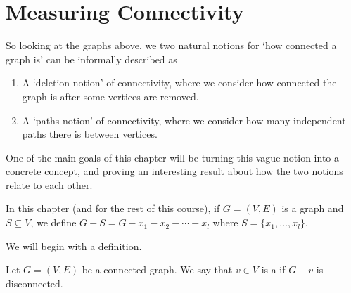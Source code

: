 \documentclass[a4paper]{scrreprt}
\begin{document}
\section{Measuring Connectivity}

So looking at the graphs above, we two natural notions for `how connected a graph is' can be informally described as
\begin{enumerate}
	\item A `deletion notion' of connectivity, where we consider how connected the graph is after some vertices are removed.
	\item A `paths notion' of connectivity, where we consider how many independent paths there is between vertices.
\end{enumerate}

One of the main goals of this chapter will be turning this vague notion into a concrete concept, and proving an interesting result about how the two notions relate to each other.

\begin{notation}
	In this chapter (and for the rest of this course), if $G = (V, E)$ is a graph and $S \subseteq V$, we define $G - S = G - x_1 - x_2 - \cdots - x_l$ where $S = \{x_1, \dots, x_l\}$.
\end{notation}

We will begin with a definition.

\begin{definition}
Let $G = (V, E)$ be a connected graph. We say that $v \in V$ is a  if $G - v$ is disconnected.	
\end{definition}
\end{document}
